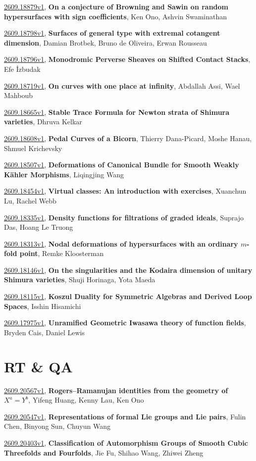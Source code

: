 \documentclass[9pt, a4paper]{article}
\theoremstyle{plain}
\theoremstyle{definition}
\theoremstyle{remark}
\newcommand{\arxiv}[3]{\href{https://arxiv.org/abs/#1}{#1}, \textbf{\textcolor{arxivblue}{#2}}, #3}
\begin{document}
\arxiv{2609.18879v1}{On a conjecture of Browning and Sawin on random hypersurfaces with sign coefficients}{Ken Ono, Ashvin Swaminathan}

\arxiv{2609.18798v1}{Surfaces of general type with extremal cotangent dimension}{Damian Brotbek, Bruno de Oliveira, Erwan Rousseau}

\arxiv{2609.18796v1}{Monodromic Perverse Sheaves on Shifted Contact Stacks}{Efe İzbudak}

\arxiv{2609.18719v1}{On curves with one place at infinity}{Abdallah Assi, Wael Mahboub}

\arxiv{2609.18665v1}{Stable Trace Formula for Newton strata of Shimura varieties}{Dhruva Kelkar}

\arxiv{2609.18608v1}{Pedal Curves of a Bicorn}{Thierry Dana-Picard, Moshe Hanau, Shmuel Krichevsky}

\arxiv{2609.18507v1}{Deformations of Canonical Bundle for Smooth Weakly Kähler Morphisms}{Liqingjing Wang}

\arxiv{2609.18454v1}{Virtual classes: An introduction with exercises}{Xuanchun Lu, Rachel Webb}

\arxiv{2609.18335v1}{Density functions for filtrations of graded ideals}{Suprajo Das, Hoang Le Truong}

\arxiv{2609.18313v1}{Nodal deformations of hypersurfaces with an ordinary $m$-fold point}{Remke Kloosterman}

\arxiv{2609.18146v1}{On the singularities and the Kodaira dimension of unitary Shimura varieties}{Shuji Horinaga, Yota Maeda}

\arxiv{2609.18115v1}{Koszul Duality for Symmetric Algebras and Derived Loop Spaces}{Isshin Hisamichi}

\arxiv{2609.17975v1}{Unramified Geometric Iwasawa theory of function fields}{Bryden Cais, Daniel Lewis}


\section{RT \& QA}
\arxiv{2609.20567v1}{Rogers--Ramanujan identities from the geometry of $X^a=Y^b$}{Yifeng Huang, Kenny Lau, Ken Ono}

\arxiv{2609.20547v1}{Representations of formal Lie groups and Lie pairs}{Fulin Chen, Binyong Sun, Chuyun Wang}

\arxiv{2609.20403v1}{Classification of Automorphism Groups of Smooth Cubic Threefolds and Fourfolds}{Jie Fu, Shihao Wang, Zhiwei Zheng}
\end{document}
